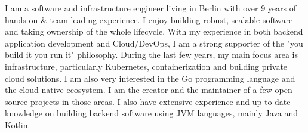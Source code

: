 
\begin{cvparagraph}

    I am a software and infrastructure engineer living in Berlin
    with over 9 years of hands-on \& team-leading experience.
    \newline
    I enjoy building robust, scalable software and taking ownership of the whole lifecycle.
    \newline
    With my experience in both backend application development and Cloud/DevOps,
    I am a strong supporter of the "you build it you run it" philosophy.
    \newline
    During the last few years, my main focus area is infrastructure, particularly Kubernetes,
    containerization and building private cloud solutions.
    I am also very interested in the Go programming language and the cloud-native ecosystem.
    I am the creator and the maintainer of a few open-source projects in those areas.
    \newline
    I also have extensive experience and up-to-date knowledge on building backend software
    using JVM languages, mainly Java and Kotlin.

\end{cvparagraph}
